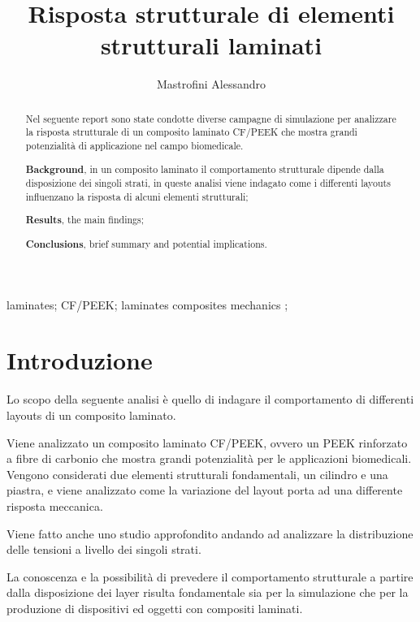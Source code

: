 \documentclass[a4paper,num-refs]{oup-contemporary}
\title{Risposta strutturale di elementi strutturali laminati}
\author{Mastrofini Alessandro}
\begin{document}
\begin{frontmatter}
\maketitle
\begin{abstract}

Nel seguente report sono state condotte diverse campagne di simulazione per analizzare la risposta strutturale di un composito laminato CF/PEEK che mostra grandi potenzialità di applicazione nel campo biomedicale. 

 \textbf{Background}, in un composito laminato il comportamento strutturale dipende dalla disposizione dei singoli strati, in queste analisi viene indagato come i differenti layouts influenzano la risposta di alcuni elementi strutturali;
 
  \textbf{Results}, \color{red}the main findings;
  
   \textbf{Conclusions}, brief summary and potential implications. 
   

\end{abstract}

\begin{keywords}
laminates; CF/PEEK; laminates composites mechanics ; 
\end{keywords}
\end{frontmatter}



\section{Introduzione}

Lo scopo della seguente analisi è quello di indagare il comportamento di differenti layouts di un composito laminato.

Viene analizzato un composito laminato CF/PEEK, ovvero un PEEK rinforzato a fibre di carbonio che mostra grandi potenzialità per le applicazioni biomedicali. Vengono considerati due elementi strutturali fondamentali, un cilindro e una piastra, e viene analizzato come la variazione del layout porta ad una differente risposta meccanica.  

Viene fatto anche uno studio approfondito andando ad analizzare la distribuzione delle tensioni a livello dei singoli strati. 

La conoscenza e la possibilità di prevedere il comportamento strutturale a partire dalla disposizione dei layer risulta fondamentale sia per la simulazione che per la produzione di dispositivi ed oggetti con compositi laminati. 
\end{document}
